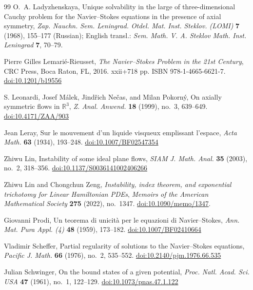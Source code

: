 \begin{thebibliography}{99}
O.~A. Ladyzhenskaya, Unique solvability in the large of three-dimensional Cauchy problem for the
Navier--Stokes equations in the presence of axial symmetry,
\emph{Zap. Nauchn. Sem. Leningrad. Otdel. Mat. Inst. Steklov. (LOMI)} \textbf{7} (1968), 155--177 (Russian);
English transl.: \emph{Sem. Math. V. A. Steklov Math. Inst. Leningrad} \textbf{7}, 70--79.

Pierre Gilles Lemari\'{e}-Rieusset, \emph{The Navier--Stokes Problem in the 21st Century},
CRC Press, Boca Raton, FL, 2016. xxii+718 pp. ISBN 978-1-4665-6621-7.
\href{https://doi.org/10.1201/b19556}{doi:10.1201/b19556}

S. Leonardi, Josef M\'{a}lek, Jind\v{r}ich Ne\v{c}as, and Milan Pokorn\'{y}, On axially symmetric
flows in $\mathbb{R}^3$, \emph{Z. Anal. Anwend.} \textbf{18} (1999), no.~3, 639--649.
\href{https://doi.org/10.4171/ZAA/903}{doi:10.4171/ZAA/903}

Jean Leray, Sur le mouvement d'un liquide visqueux emplissant l'espace,
\emph{Acta Math.} \textbf{63} (1934), 193--248.
\href{https://doi.org/10.1007/BF02547354}{doi:10.1007/BF02547354}

Zhiwu Lin, Instability of some ideal plane flows, \emph{SIAM J. Math. Anal.} \textbf{35} (2003), no.~2,
318--356.
\href{https://doi.org/10.1137/S0036141002406266}{doi:10.1137/S0036141002406266}

Zhiwu Lin and Chongchun Zeng,
\emph{Instability, index theorem, and exponential trichotomy for
Linear Hamiltonian PDEs},
\emph{Memoirs of the American Mathematical Society} \textbf{275} (2022),
no.~1347. \href{https://doi.org/10.1090/memo/1347}{doi:10.1090/memo/1347}.

Giovanni Prodi, Un teorema di unicit\`{a} per le equazioni di Navier--Stokes,
\emph{Ann. Mat. Pura Appl. (4)} \textbf{48} (1959), 173--182.
\href{https://doi.org/10.1007/BF02410664}{doi:10.1007/BF02410664}

Vladimir Scheffer, Partial regularity of solutions to the Navier--Stokes equations,
\emph{Pacific J. Math.} \textbf{66} (1976), no.~2, 535--552.
\href{https://doi.org/10.2140/pjm.1976.66.535}{doi:10.2140/pjm.1976.66.535}

Julian Schwinger, On the bound states of a given potential, \emph{Proc. Natl. Acad. Sci. USA}
\textbf{47} (1961), no.~1, 122--129.
\href{https://doi.org/10.1073/pnas.47.1.122}{doi:10.1073/pnas.47.1.122}


\end{thebibliography}
